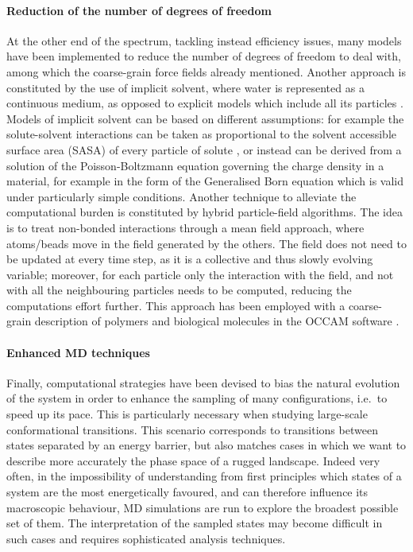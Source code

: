 \paragraph{Reduction of the number of degrees of freedom}
At the other end of the spectrum, tackling instead efficiency issues, many models have been implemented to reduce the number of degrees of freedom to deal with, among which the coarse-grain force fields already mentioned.
%
Another approach is constituted by the use of implicit solvent, where water is represented as a continuous medium, as opposed to explicit models which include all its particles \cite{Kleinjung2014}.
%
Models of implicit solvent can be based on different assumptions: for example the solute-solvent interactions can be taken as proportional to the solvent accessible surface area (SASA) of every particle of solute \cite{Fraternali1996,Kleinjung2003,Kleinjung2012,Fornili2012}, or instead can be derived from a solution of the Poisson-Boltzmann equation governing the charge density in a material, for example in the form of the Generalised Born equation \cite{Zhu2005} which is valid under particularly simple conditions.
%
Another technique to alleviate the computational burden is constituted by hybrid particle-field algorithms. The idea is to treat non-bonded interactions through a mean field approach, where atoms/beads move in the field generated by the others. The field does not need to be updated at every time step, as it is a collective and thus slowly evolving variable; moreover, for each particle only the interaction with the field, and not with all the neighbouring particles needs to be computed, reducing the computations effort further. This approach has been employed with a coarse-grain description of polymers and biological molecules in the OCCAM software \cite{Milano2009}.

\paragraph{Enhanced MD techniques}
Finally, computational strategies have been devised to bias the natural evolution of the system in order to enhance the sampling of many configurations, i.e.\ to speed up its pace.
%
This is particularly necessary when studying large-scale conformational transitions. This scenario corresponds to transitions between states separated by an energy barrier, but also matches cases in which we want to describe more accurately the phase space of a rugged landscape. Indeed very often, in the impossibility of understanding from first principles which states of a system are the most energetically favoured, and can therefore influence its macroscopic behaviour, MD simulations are run to explore the broadest possible set of them. The interpretation of the sampled states may become difficult in such cases and requires sophisticated analysis techniques.

